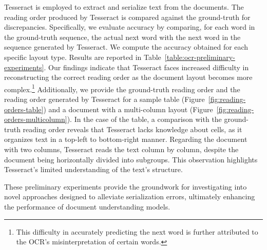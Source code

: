 Tesseract is employed to extract and serialize text from the documents. The reading order produced by Tesseract is compared against the ground-truth for discrepancies. Specifically, we evaluate accuracy by comparing, for each word in the ground-truth sequence, the actual next word with the next word in the sequence generated by Tesseract. We compute the accuracy obtained for each specific layout type. Results are reported in Table~\ref{table:ocr-preliminary-experiments}. Our findings indicate that Tesseract faces increased difficulty in reconstructing the correct reading order as the document layout becomes more complex.\footnote{This difficulty in accurately predicting the next word is further attributed to the \ac{OCR}'s misinterpretation of certain words.} Additionally, we provide the ground-truth reading order and the reading order generated by Tesseract for a sample table (Figure~\ref{fig:reading-orders-table}) and a document with a multi-column layout  (Figure~\ref{fig:reading-orders-multicolumn}). In the case of the table, a comparison with the ground-truth reading order reveals that Tesseract lacks knowledge about cells, as it organizes text in a top-left to bottom-right manner. Regarding the document with two columns, Tesseract reads the text column by column, despite the document being horizontally divided into subgroups. This observation highlights Tesseract's limited understanding of the text's structure. 

These preliminary experiments provide the groundwork for investigating into novel approaches designed to alleviate serialization errors, ultimately enhancing the performance of document understanding models.

